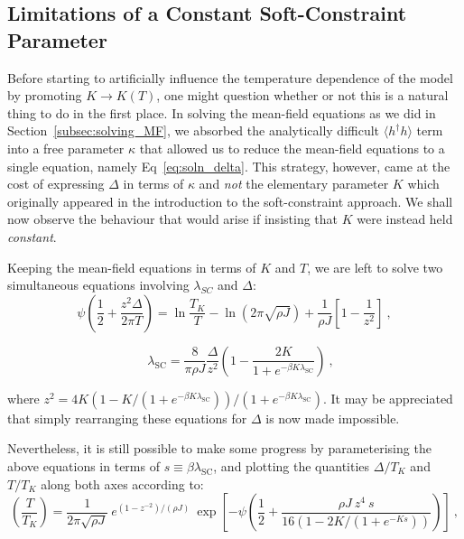 
\subsection{Limitations of a Constant Soft-Constraint Parameter}

Before starting to artificially influence the temperature dependence of the model by promoting $ K \rightarrow K(T) $, one might question whether or not this is a natural thing to do in the first place. In solving the mean-field equations as we did in Section~\ref{subsec:solving_MF}, we absorbed the analytically difficult $ \langle h^{\dagger} h \rangle $ term into a free parameter $ \kappa $ that allowed us to reduce the mean-field equations to a single equation, namely Eq~\eqref{eq:soln_delta}. This strategy, however, came at the cost of expressing $ \Delta $ in terms of $ \kappa $ and \emph{not} the elementary parameter $ K $ which originally appeared in the introduction to the soft-constraint approach. We shall now observe the behaviour that would arise if insisting that $ K $ were instead held \emph{constant}.

Keeping the mean-field equations in terms of $ K $ and $ T $, we are left to solve two simultaneous equations involving $ \lambda_{SC} $ and $ \Delta $:
\begin{equation}
\psi \left( \frac{1}{2} + \frac{z^2 \Delta}{2 \pi T} \right) = \ln{\frac{T_K}{T}} - \ln{\left( 2 \pi \sqrt{\rho J} \right)} + \frac{1}{\rho J} \left[ 1 - \frac{1}{z^2} \right] ~ ,
\end{equation}

\begin{equation}
\quad \lambda_{\text{SC}} = \frac{8}{\pi \rho J} \frac{\Delta}{z^2} \left( 1 - \frac{2 K}{1 + e^{- \beta K \lambda_{\text{SC}}}} \right) ~ ,
\end{equation}

where $ z^2 = 4 K \left( 1 - K / (1 + e^{- \beta K \lambda_{\text{SC}}}) \right) / \left({1 + e^{- \beta K \lambda_{\text{SC}}}} \right) $. It may be appreciated that simply rearranging these equations for $ \Delta $ is now made impossible.

Nevertheless, it is still possible to make some progress by parameterising the above equations in terms of $ s \equiv \beta \lambda_{\text{SC}} $, and plotting the quantities $ \Delta / T_K $ and $ T / T_K $ along both axes according to:
\begin{equation}
\left( \frac{T}{T_K} \right) = \frac{1}{2 \pi \sqrt{\rho J}} ~ e^{(1 - z^{-2}) / (\rho J)} ~ \exp{\left[- \psi \left( \frac{1}{2} + \frac{\rho J ~ z^4 ~ s}{16 (1 - 2 K / (1 + e^{- K s}))} \right) \right]} ~ ,
\label{eq:parametric_T}
\end{equation}

